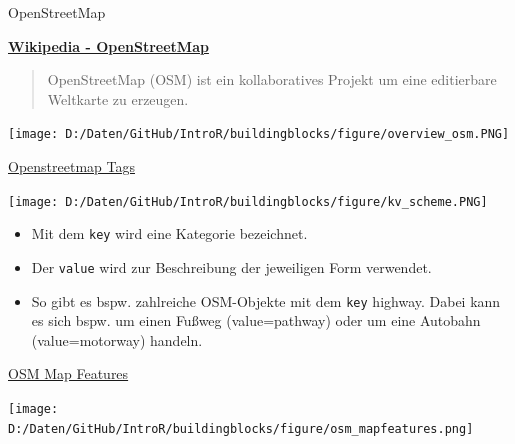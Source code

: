 \documentclass[ignorenonframetext,]{beamer}
\providecommand{\tightlist}{%
  \setlength{\itemsep}{0pt}\setlength{\parskip}{0pt}}
\begin{document}
\begin{frame}{OpenStreetMap}

\begin{block}{\href{https://en.wikipedia.org/wiki/OpenStreetMap}{\textbf{Wikipedia
- OpenStreetMap}}}

\begin{quote}
OpenStreetMap (OSM) ist ein kollaboratives Projekt um eine editierbare
Weltkarte zu erzeugen.
\end{quote}

\texttt{[image: D:/Daten/GitHub/IntroR/buildingblocks/figure/overview\_osm.PNG]}

\end{block}

\end{frame}

\begin{frame}[fragile]{\href{https://wiki.openstreetmap.org/wiki/Tags}{Openstreetmap
Tags}}

\texttt{[image: D:/Daten/GitHub/IntroR/buildingblocks/figure/kv\_scheme.PNG]}

\begin{itemize}
\tightlist
\item
  Mit dem \texttt{key} wird eine Kategorie bezeichnet.
\item
  Der \texttt{value} wird zur Beschreibung der jeweiligen Form
  verwendet.
\item
  So gibt es bspw. zahlreiche OSM-Objekte mit dem \texttt{key} highway.
  Dabei kann es sich bspw. um einen Fußweg (value=pathway) oder um eine
  Autobahn (value=motorway) handeln.
\end{itemize}

\end{frame}

\begin{frame}{\href{http://wiki.openstreetmap.org/wiki/DE:Map_Features}{OSM
Map Features}}

\texttt{[image: D:/Daten/GitHub/IntroR/buildingblocks/figure/osm\_mapfeatures.png]}

\end{frame}
\end{document}
